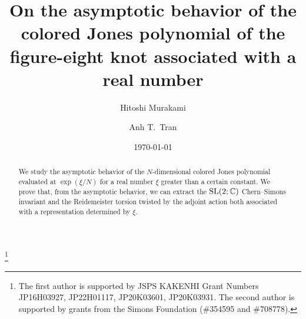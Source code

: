 \documentclass[a4paper,dvipdfmx]{amsart}
\theoremstyle{plain}
\theoremstyle{definition}
\theoremstyle{remark}
\newcommand{\C}{\mathbb{C}}
\newcommand{\SL}{\rm{SL}}
\numberwithin{equation}{section}
\begin{document}
\title[The colored Jones polynomial of the figure-eight knot]
{On the asymptotic behavior of the colored Jones polynomial of the figure-eight knot associated with a real number}
\author{Hitoshi Murakami}
\address{
Graduate School of Information Sciences,
Tohoku University,
Aramaki-aza-Aoba 6-3-09, Aoba-ku,
Sendai 980-8579, Japan}
\author{Anh T.~Tran}
\address{
Department of Mathematical Sciences, The University of Texas at Dallas, Richardson,
TX 75080, USA}
\date{\today}
\begin{abstract}
We study the asymptotic behavior of the $N$-dimensional colored Jones polynomial evaluated at $\exp(\xi/N)$ for a real number $\xi$ greater than a certain constant.
We prove that, from the asymptotic behavior, we can extract the $\SL(2;\C)$ Chern--Simons invariant and the Reidemeister torsion twisted by the adjoint action both associated with a representation determined by $\xi$.
\end{abstract}
\thanks{The first author is supported by JSPS KAKENHI Grant Numbers JP16H03927, JP22H01117, JP20K03601, JP20K03931.
The second author is supported by grants from the Simons Foundation (\#354595 and \#708778).}
\maketitle








\end{document}
